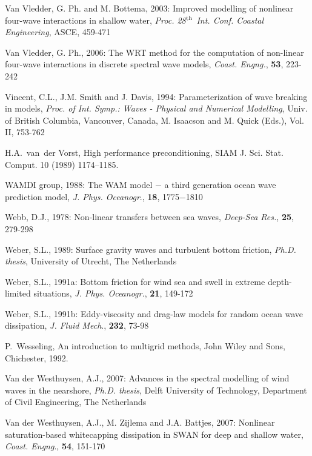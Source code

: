 \documentclass[12pt]{book}
\begin{document}
\begin{thebibliography}{10}
Van Vledder, G. Ph. and M. Bottema, 2003: Improved modelling of nonlinear four-wave interactions
in shallow water, {\it Proc. 28$^{{\rm th}}$ Int. Conf. Coastal Engineering}, ASCE, 459-471

Van Vledder, G. Ph., 2006: The {WRT} method for the computation of non-linear four-wave interactions in
discrete spectral wave models, {\it Coast. Engng.}, {\bf 53}, 223-242

Vincent, C.L., J.M. Smith and J. Davis, 1994: Parameterization of wave breaking in  models, {\it Proc. of Int.
Symp.: Waves - Physical and Numerical Modelling}, Univ. of British Columbia, Vancouver,
Canada, M. Isaacson and M. Quick (Eds.), Vol. II, 753-762

H.A.~van~der Vorst, High performance preconditioning, SIAM J. Sci. Stat. Comput.
  10 (1989) 1174--1185.

WAMDI group, 1988: The WAM model $-$ a third generation ocean wave prediction model, {\it J. Phys.
Oceanogr}., {\bf 18}, 1775$-$1810

Webb, D.J., 1978: Non-linear transfers between sea waves, {\it Deep-Sea Res.}, {\bf 25}, 279-298

Weber, S.L., 1989: Surface gravity waves and turbulent bottom friction, {\it Ph.D. thesis}, University of Utrecht,
The Netherlands

Weber, S.L., 1991a: Bottom friction for wind sea and swell in extreme depth-limited situations, {\it J. Phys.
Oceanogr.}, {\bf 21}, 149-172

Weber, S.L., 1991b: Eddy-viscosity and drag-law models for random ocean wave dissipation, {\it J. Fluid
Mech}., {\bf 232}, 73-98

P.~Wesseling, An introduction to multigrid methods, John Wiley and Sons,
  Chichester, 1992.

Van der Westhuysen, A.J., 2007: Advances in the spectral modelling of wind waves in the nearshore, {\it Ph.D. thesis},
Delft University of Technology, Department of Civil Engineering, The Netherlands

Van der Westhuysen, A.J., M. Zijlema and J.A. Battjes, 2007: Nonlinear saturation-based whitecapping dissipation
in SWAN for deep and shallow water, {\it Coast. Engng}., {\bf 54}, 151-170



\end{thebibliography}
\end{document}
